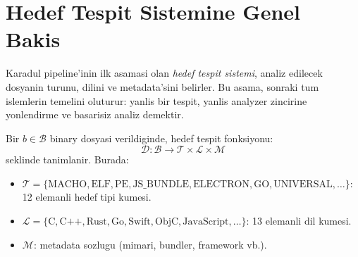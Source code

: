 

\section{Hedef Tespit Sistemine Genel Bakis}
\label{sec:target-overview}

Karadul pipeline'inin ilk asamasi olan \emph{hedef tespit sistemi}, analiz edilecek dosyanin turunu, dilini ve metadata'sini belirler. Bu asama, sonraki tum islemlerin temelini oluturur: yanlis bir tespit, yanlis analyzer zincirine yonlendirme ve basarisiz analiz demektir.

\begin{tanim}
Bir $b \in \mathcal{B}$ binary dosyasi verildiginde, hedef tespit fonksiyonu:
\begin{equation}
\label{eq:target-detect}
\mathcal{D}: \mathcal{B} \longrightarrow \mathcal{T} \times \mathcal{L} \times \mathcal{M}
\end{equation}
seklinde tanimlanir. Burada:
\begin{itemize}
\item $\mathcal{T} = \{\text{MACHO}, \text{ELF}, \text{PE}, \text{JS\_BUNDLE}, \text{ELECTRON}, \text{GO}, \text{UNIVERSAL}, \ldots\}$: 12 eleman\-li hedef tipi kumesi.
\item $\mathcal{L} = \{\text{C}, \text{C++}, \text{Rust}, \text{Go}, \text{Swift}, \text{ObjC}, \text{JavaScript}, \ldots\}$: 13 eleman\-li dil kumesi.
\item $\mathcal{M}$: metadata sozlugu (mimari, bundler, framework vb.).
\end{itemize}
\end{tanim}

